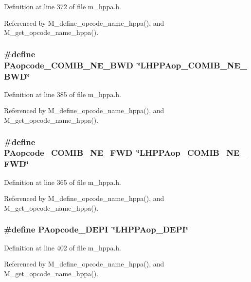 Definition at line 372 of file m\_\-hppa.h.

Referenced by M\_\-define\_\-opcode\_\-name\_\-hppa(), and M\_\-get\_\-opcode\_\-name\_\-hppa().
\subsubsection{\setlength{\rightskip}{0pt plus 5cm}\#define PAopcode\_\-COMIB\_\-NE\_\-BWD~\char`\"{}LHPPAop\_\-COMIB\_\-NE\_\-BWD\char`\"{}}\label{m__hppa_8h_b3e313d3d8a3bf69f3a3c5a462116324}




Definition at line 385 of file m\_\-hppa.h.

Referenced by M\_\-define\_\-opcode\_\-name\_\-hppa(), and M\_\-get\_\-opcode\_\-name\_\-hppa().
\subsubsection{\setlength{\rightskip}{0pt plus 5cm}\#define PAopcode\_\-COMIB\_\-NE\_\-FWD~\char`\"{}LHPPAop\_\-COMIB\_\-NE\_\-FWD\char`\"{}}\label{m__hppa_8h_1b388b1a83ed7690d2ad7bb0c7ef6ab7}




Definition at line 365 of file m\_\-hppa.h.

Referenced by M\_\-define\_\-opcode\_\-name\_\-hppa(), and M\_\-get\_\-opcode\_\-name\_\-hppa().
\subsubsection{\setlength{\rightskip}{0pt plus 5cm}\#define PAopcode\_\-DEPI~\char`\"{}LHPPAop\_\-DEPI\char`\"{}}\label{m__hppa_8h_c5e448986fc635499bdafec6ba786e56}




Definition at line 402 of file m\_\-hppa.h.

Referenced by M\_\-define\_\-opcode\_\-name\_\-hppa(), and M\_\-get\_\-opcode\_\-name\_\-hppa().
